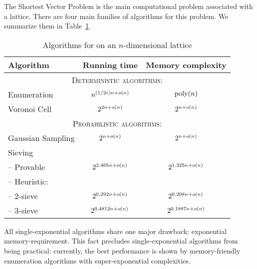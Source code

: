 The Shortest Vector Problem is the main computational problem associated with a lattice. There are four main families of algorithms for this problem. We summarize them in Table~\ref{table:SVPAlgs}.
\begin{table}[h]
	\centering
	\begin{tabular}{| l | c | c |}
		\hline
		\textbf{Algorithm} & \textbf{Running time} & \textbf{Memory complexity} \\ \hline
		\multicolumn{3}{|c|}{\textsc{ Deterministic algorithms:} } \\ \hline
		Enumeration \cite{Kan87, C:HanSte07} & $n^{ (1/2e) n + o(n)}$ & $\mathrm{poly}(n)$ \\ \hline
		Voronoi Cell \cite{STOC:MicVou10} & $2^{2n + o(n)}$ & $2^{n+o(n)}$ \\ \hline
		\multicolumn{3}{|c|}{\textsc{ Probabilistic algorithms:} } \\ \hline
		Gaussian Sampling \cite{STOC:ADRS15} & $2^{n+ o(n)}$ & $2^{n+ o(n)}$ \\ \hline
		Sieving \cite{STOC:AjtKumSiv01} & & \\ [-1ex]
			\hspace{5pt} -- Provable \cite{PujSte09} & $2^{2.465n + o(n)}$& $2^{1.325n + o(n)}$ \\ [-1ex]
			\hspace{5pt} -- Heuristic: & & \\ [-1ex]
				\hspace{15pt} -- $2$-sieve \cite{SODA:BDGL16} & $2^{0.292n + o(n)}$ & $2^{0.208n + o(n)}$ \\
				\hspace{15pt} -- $3$-sieve \cite{BLS16} & $2^{0.4812n + o(n)}$ & $2^{0.1887n + o(n)}$  \\ \hline 
	\end{tabular}
	\caption[Algorithms for \SVP]{Algorithms for \SVP on an $n$-dimensional lattice} 
	 
	\label{table:SVPAlgs}
\end{table} 


All single-exponential algorithms share one major drawback: exponential memory-requirement. This fact precludes single-exponential \SVP algorithms from being practical: currently, the best performance is shown by memory-friendly enumeration algorithms with super-exponential complexities.
 
